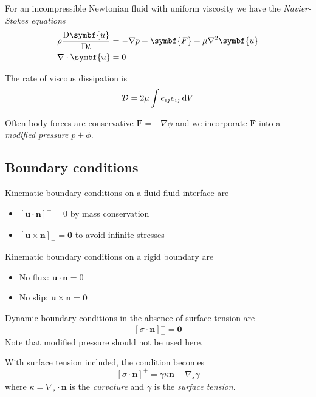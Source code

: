 \documentclass{jknotes}
\begin{document}
For an incompressible Newtonian fluid with uniform viscosity we have the
\emph{Navier-Stokes equations}
\begin{equation}
	\begin{aligned}
		\rho \frac{\diffD{\symbf{u}}}{\diffD{t}} &= - \nabla p + \symbf{F} + \mu
			\nabla^2 \symbf{u} \\
			\nabla \cdot \symbf{u} &=0
	\end{aligned}
\end{equation}

The rate of viscous dissipation is
\begin{equation}
	\mathcal{D} = 2 \mu \int e_{ij} e_{ij} \, \diffd{V}
\end{equation}

Often body forces are conservative $\symbf{F} = -\nabla \phi$ and we incorporate
$\symbf{F}$ into a \emph{modified pressure} $p + \phi$.

\subsection{Boundary conditions}
Kinematic boundary conditions on a fluid-fluid interface are
\begin{itemize}
	\item $\left[ \symbf{u} \cdot \symbf{n} \right]^+_- = 0$ by mass conservation
	\item $\left[ \symbf{u} \times \symbf{n} \right]^+_- = \symbf{0}$ to avoid infinite
		stresses
\end{itemize}

Kinematic boundary conditions on a rigid boundary are
\begin{itemize}
	\item No flux: $\symbf{u} \cdot \symbf{n} = 0$
	\item No slip: $\symbf{u} \times \symbf{n} = \symbf{0}$
\end{itemize}

Dynamic boundary conditions in the absence of surface tension are 
\begin{equation}
	\left[\sigma \cdot \symbf{n}\right]^+_- = \symbf{0}
\end{equation}
Note that modified pressure should not be used here.

With surface tension included, the condition becomes
\begin{equation}
	\left[ \sigma \cdot \symbf{n} \right]^+_- = \gamma \kappa \symbf{n} - \nabla_s
	\gamma
\end{equation}
where $\kappa = \nabla_s \cdot \symbf{n}$ is the \emph{curvature} and $\gamma$ is
the \emph{surface tension}.
\end{document}
